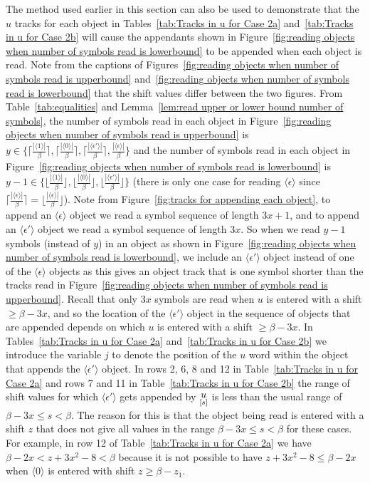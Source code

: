 \documentclass[11pt]{article} \usepackage{amsfonts,amsmath,amssymb,amsthm}
\newcommand{\tne}[1]{\ensuremath{\langle #1\rangle}}
\newcommand{\encodeOne}{\tne{1}}
\newcommand{\encodeZero}{\tne{0}}
\newcommand{\encodeDeletion}{\tne{\epsilon}}
\newcommand{\encodeDeletionPrime}{\tne{\epsilon'}}
\newcommand{\track}[2]{\raisebox{2.5pt}{\ensuremath{\underset{[#1]}#2}}}
\begin{document}
 
 



The method used earlier in this section can also be used to demonstrate that the $u$ tracks for each object in Tables~\ref{tab:Tracks in u for Case 2a} and~\ref{tab:Tracks in u for Case 2b} will cause the appendants shown in Figure~\ref{fig:reading objects when number of symbols read is lowerbound} to be appended when each object is read. 
Note from the captions of Figures~\ref{fig:reading objects when number of symbols read is upperbound} and~\ref{fig:reading objects when number of symbols read is lowerbound} that the shift values differ between the two figures. 
From Table~\ref{tab:equalities} and Lemma~\ref{lem:read upper or lower bound number of symbols}, the number of symbols read in each object in  Figure~\ref{fig:reading objects when number of symbols read is upperbound} is $y\in\{\lceil\frac{|\encodeOne|}{\beta}\rceil,\lceil\frac{|\encodeZero|}{\beta}\rceil,\lceil\frac{|\encodeDeletionPrime|}{\beta}\rceil,\frac{|\encodeDeletion|}{\beta}\}$ and the number of symbols read in each object in  Figure~\ref{fig:reading objects when number of symbols read is lowerbound} is $y-1\in\{\lfloor\frac{|\encodeOne|}{\beta}\rfloor,\lfloor\frac{|\encodeZero|}{\beta}\rfloor,\lfloor\frac{|\encodeDeletionPrime|}{\beta}\rfloor\}$ (there is only one case for reading $\encodeDeletion$ since $\lceil\frac{|\encodeDeletion|}{\beta}\rceil=\lfloor\frac{|\encodeDeletion|}{\beta}\rfloor$). 
Note from Figure~\ref{fig:tracks for appending each object}, to append an $\encodeDeletion$ object we read a symbol sequence of length $3x+1$, and to append an $\encodeDeletionPrime$ object we read a symbol sequence of length $3x$. 
So when we read $y-1$ symbols (instead of $y$) in an object as shown in Figure~\ref{fig:reading objects when number of symbols read is lowerbound}, we include an $\encodeDeletionPrime$ object instead of one of the $\encodeDeletion$ objects as this gives an object track that is one symbol shorter than the tracks read in Figure~\ref{fig:reading objects when number of symbols read is upperbound}. 
Recall that only $3x$ symbols are read when $u$ is entered with a shift $\geqslant\beta-3x$, and so the location of the $\encodeDeletionPrime$ object in the sequence of objects that are appended depends on which $u$ is entered with a shift $\geqslant\beta-3x$. 
In Tables~\ref{tab:Tracks in u for Case 2a} and~\ref{tab:Tracks in u for Case 2b} we introduce the variable $j$ to denote the position of the $u$ word within the object that appends the $\encodeDeletionPrime$ object. 
In rows 2, 6, 8 and 12 in Table~\ref{tab:Tracks in u for Case 2a} and rows 7 and 11 in Table~\ref{tab:Tracks in u for Case 2b} the range of shift values for which $\encodeDeletionPrime$ gets appended by $\track{s}{u}$ is less than the usual range of $\beta-3x\leqslant s<\beta$. 
The reason for this is that the object being read is entered with a shift $z$ that does not give all values in the range $\beta-3x\leqslant s<\beta$ for these cases. 
For example, in row 12 of Table~\ref{tab:Tracks in u for Case 2a} we have $\beta-2x< z+3x^2-8<\beta$ because it is not possible to have $z+3x^2-8\leqslant\beta-2x$ when $\encodeZero$ is entered with shift $z\geqslant\beta-z_1$.
\end{document}
